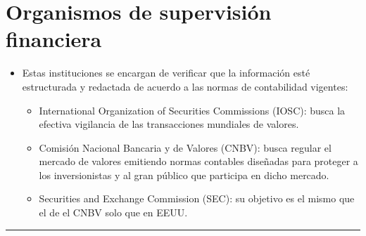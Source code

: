 \documentclass{article}
\begin{document}
\section{Organismos de supervisión financiera}
\begin{itemize}
    \item Estas instituciones se encargan de verificar que la información esté estructurada y redactada de acuerdo a las normas de contabilidad vigentes:
    \begin{itemize}
        \item International Organization of Securities Commissions (IOSC): busca la efectiva vigilancia de las transacciones mundiales de valores.
        \item Comisión Nacional Bancaria y de Valores (CNBV): busca regular el mercado de valores emitiendo normas contables diseñadas para proteger a los inversionistas y al gran público que participa en dicho mercado.
        \item Securities and Exchange Commission (SEC): su objetivo es el mismo que el de el CNBV solo que en EEUU. 
    \end{itemize}
\end{itemize}

\rule{16cm}{1pt}
\end{document}
